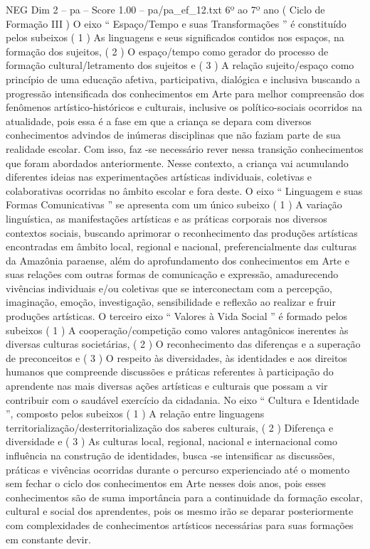 \begin{textsample}{NEG Dim 2 – pa – Score 1.00 – pa/pa\_ef\_12.txt}  \label{ex:f2_neg_228}
6º ao 7º ano ( Ciclo de Formação III ) O eixo “ Espaço/Tempo e suas Transformações ” é constituído pelos subeixos ( 1 ) As linguagens e seus significados contidos nos espaços, na formação dos sujeitos, ( 2 ) O espaço/tempo como gerador do processo de formação cultural/letramento dos sujeitos e ( 3 ) A relação sujeito/espaço como princípio de uma educação afetiva, participativa, dialógica e inclusiva buscando a progressão intensificada dos conhecimentos em Arte para melhor compreensão dos fenômenos artístico-históricos e culturais, inclusive os político-sociais ocorridos na atualidade, pois essa é a fase em que a criança se depara com diversos conhecimentos advindos de inúmeras disciplinas que não faziam parte de sua realidade escolar.
Com isso, faz -se necessário rever nessa transição conhecimentos que foram abordados anteriormente.
Nesse contexto, a criança vai acumulando diferentes ideias nas experimentações artísticas individuais, coletivas e colaborativas ocorridas no âmbito escolar e fora deste.
O eixo “ Linguagem e suas Formas Comunicativas ” se apresenta com um único subeixo ( 1 ) A variação linguística, as manifestações artísticas e as práticas corporais nos diversos contextos sociais, buscando aprimorar o reconhecimento das produções artísticas encontradas em âmbito local, regional e nacional, preferencialmente das culturas da Amazônia paraense, além do aprofundamento dos conhecimentos em Arte e suas relações com outras formas de comunicação e expressão, amadurecendo vivências individuais e/ou coletivas que se interconectam com a percepção, imaginação, emoção, investigação, sensibilidade e reflexão ao realizar e fruir produções artísticas.
O terceiro eixo “ Valores à Vida Social ” é formado pelos subeixos ( 1 ) A cooperação/competição como valores antagônicos inerentes às diversas culturas societárias, ( 2 ) O reconhecimento das diferenças e a superação de preconceitos e ( 3 ) O respeito às diversidades, às identidades e aos direitos humanos que compreende discussões e práticas referentes à participação do aprendente nas mais diversas ações artísticas e culturais que possam a vir contribuir com o saudável exercício da cidadania.
No eixo “ Cultura e Identidade ”, composto pelos subeixos ( 1 ) A relação entre linguagens territorialização/desterritorialização dos saberes culturais, ( 2 ) Diferença e diversidade e ( 3 ) As culturas local, regional, nacional e internacional como influência na construção de identidades, busca -se intensificar as discussões, práticas e vivências ocorridas durante o percurso experienciado até o momento sem fechar o ciclo dos conhecimentos em Arte nesses dois anos, pois esses conhecimentos são de suma importância para a continuidade da formação escolar, cultural e social dos aprendentes, pois os mesmo irão se deparar posteriormente com complexidades de conhecimentos artísticos necessárias para suas formações em constante devir.

\end{textsample}
